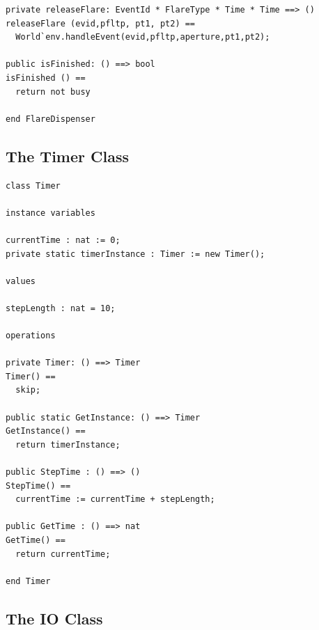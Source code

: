 \documentclass{overturerepchap}
\begin{document}
\begin{lstlisting}
private releaseFlare: EventId * FlareType * Time * Time ==> ()
releaseFlare (evid,pfltp, pt1, pt2) == 
  World`env.handleEvent(evid,pfltp,aperture,pt1,pt2);

public isFinished: () ==> bool
isFinished () == 
  return not busy

end FlareDispenser
\end{lstlisting}

\subsection{The Timer Class}\label{sec:timerapp}

\begin{lstlisting}
class Timer

instance variables

currentTime : nat := 0;
private static timerInstance : Timer := new Timer(); 

values

stepLength : nat = 10;

operations

private Timer: () ==> Timer
Timer() ==
  skip;
  
public static GetInstance: () ==> Timer
GetInstance() ==
  return timerInstance;

public StepTime : () ==> ()
StepTime() ==
  currentTime := currentTime + stepLength;

public GetTime : () ==> nat
GetTime() ==
  return currentTime;

end Timer
\end{lstlisting}

\subsection{The IO Class}
\end{document}
